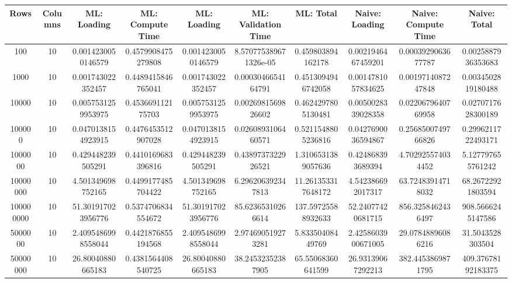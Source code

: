 \begin{table}[htb]
    \centering
    \begin{tabular}{@{}cccccccccc@{}}
        \toprule
        Rows & Columns & ML: Loading & ML: Compute Time & ML: Loading & ML: Validation Time & ML: Total & Naive: Loading & Naive: Compute Time & Naive: Total \\
        \midrule
        100 & 10 & 0.0014230050146579 & 0.4579908475279808 & 0.0014230050146579 & 8.570775389671326e-05 & 0.459803894162178 & 0.0021946467459201 & 0.0003929063677787 & 0.0025887936353683 \\
        1000 & 10 & 0.001743022352457 & 0.4489415846765041 & 0.001743022352457 & 0.0003046654164791 & 0.4513094946742058 & 0.0014781057834625 & 0.0019714087247848 & 0.0034502819180488 \\
        10000 & 10 & 0.0057531259953975 & 0.453669112175703 & 0.0057531259953975 & 0.0026981569826602 & 0.4624297805130481 & 0.0050028339028358 & 0.0220679640769958 & 0.0270717628300189 \\
        100000 & 10 & 0.0470138154923915 & 0.4476453512907028 & 0.0470138154923915 & 0.0260893106460571 & 0.5211548805236816 & 0.0427690036594867 & 0.2568500749766826 & 0.2996211722493171 \\
        1000000 & 10 & 0.429448239505291 & 0.4410169683396816 & 0.429448239505291 & 0.4389737322926521 & 1.3106531389057636 & 0.424868393689394 & 4.702925574034452 & 5.127797655761242 \\
        10000000 & 10 & 4.501349698752165 & 0.4499177485704422 & 4.501349698752165 & 6.296206392347813 & 11.261353317648172 & 4.542386692017317 & 63.72483914718032 & 68.26722921803594 \\
        100000000 & 10 & 51.301917023956776 & 0.5374706834554672 & 51.301917023956776 & 85.62365310266614 & 137.59725588932633 & 52.24077420681715 & 856.3258462436497 & 908.5666245147586 \\
        5000000 & 10 & 2.4095486998558044 & 0.4421876855194568 & 2.4095486998558044 & 2.974690519273281 & 5.83350408449769 & 2.4258603900671005 & 29.07848896086216 & 31.5043528303504 \\
        50000000 & 10 & 26.80040880665183 & 0.4381564408540725 & 26.80040880665183 & 38.24532352387905 & 65.55068360641599 & 26.93139067292213 & 382.4453869871795 & 409.37678192183375 \\
        \bottomrule
    \end{tabular}
\end{table}
